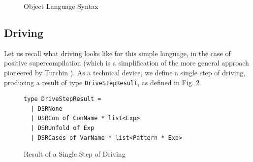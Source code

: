 \documentclass[submission,copyright,creativecommons]{eptcs}
\begin{document}
\begin{figure}
\caption{Object Language Syntax}
\label{fig:SLLsyntax}
\end{figure}

\subsection{Driving}

Let us recall what driving looks like for this simple language, in the case of positive supercompilation
(which is a simplification of the more general approach pioneered by Turchin \cite{TurchinSupercompilerConcept}).
As a technical device, we define a single step of driving, producing a
result of type \verb|DriveStepResult|, as defined in Fig. \ref{fig:DriveStepResult}

\begin{figure}
\begin{lstlisting}
type DriveStepResult =
  | DSRNone
  | DSRCon of ConName * list<Exp>
  | DSRUnfold of Exp
  | DSRCases of VarName * list<Pattern * Exp>
\end{lstlisting}
\caption{Result of a Single Step of Driving}
\label{fig:DriveStepResult}
\end{figure}
\end{document}
